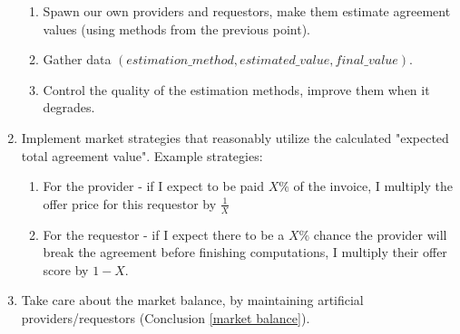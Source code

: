 \documentclass{article}
\begin{document}
\begin{enumerate}
        \begin{enumerate}
            \item Spawn our own providers and requestors, make them estimate agreement values (using methods from the previous point).
            \item Gather data $(estimation\_method, estimated\_value, final\_value)$.
            \item Control the quality of the estimation methods, improve them when it degrades.
        \end{enumerate}
    \item Implement market strategies that reasonably utilize the calculated "expected total agreement value". 
        Example strategies:
        \begin{enumerate}
            \item For the provider - if I expect to be paid $X\%$ of the invoice, I multiply the offer price for this requestor by $\frac{1}{X}$
            \item For the requestor - if I expect there to be a $X\%$ chance the provider will break the agreement before finishing computations,
                I multiply their offer score by $1 - X$.
        \end{enumerate}
    \item Take care about the market balance, by maintaining artificial providers/requestors (Conclusion \ref{market balance}).
\end{enumerate}
\end{document}
